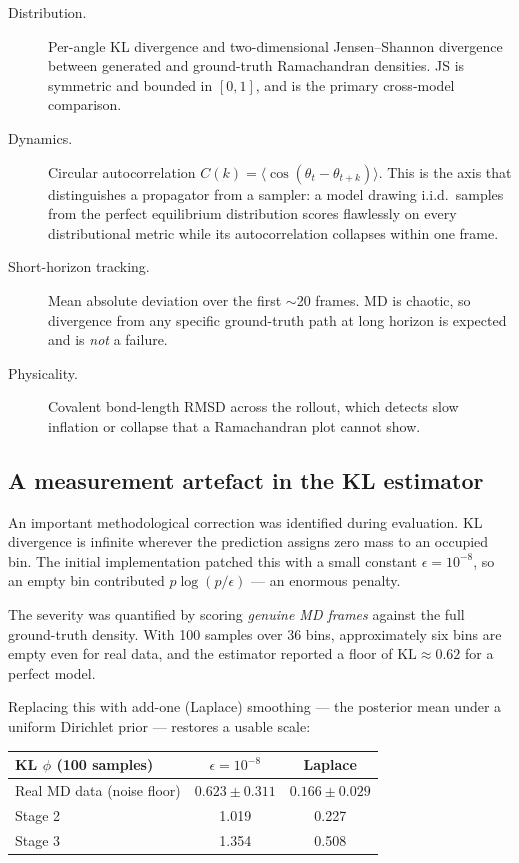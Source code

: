 \documentclass[11pt,a4paper]{article}
\begin{document}
\begin{description}
\item[Distribution.] Per-angle KL divergence and two-dimensional
Jensen--Shannon divergence between generated and ground-truth Ramachandran
densities. JS is symmetric and bounded in $[0,1]$, and is the primary
cross-model comparison.

\item[Dynamics.] Circular autocorrelation
$C(k)=\langle\cos(\theta_t-\theta_{t+k})\rangle$. This is the axis that
distinguishes a propagator from a sampler: a model drawing i.i.d.\ samples from
the perfect equilibrium distribution scores flawlessly on every distributional
metric while its autocorrelation collapses within one frame.

\item[Short-horizon tracking.] Mean absolute deviation over the first
$\sim$20 frames. MD is chaotic, so divergence from any specific ground-truth
path at long horizon is expected and is \emph{not} a failure.

\item[Physicality.] Covalent bond-length RMSD across the rollout, which detects
slow inflation or collapse that a Ramachandran plot cannot show.
\end{description}

\subsection{A measurement artefact in the KL estimator}
\label{sec:klfix}

An important methodological correction was identified during evaluation. KL
divergence is infinite wherever the prediction assigns zero mass to an occupied
bin. The initial implementation patched this with a small constant
$\epsilon = 10^{-8}$, so an empty bin contributed $p\log(p/\epsilon)$ --- an
enormous penalty.

The severity was quantified by scoring \emph{genuine MD frames} against the
full ground-truth density. With 100 samples over 36 bins, approximately six
bins are empty even for real data, and the estimator reported a floor of
$\mathrm{KL} \approx 0.62$ for a perfect model.

Replacing this with add-one (Laplace) smoothing --- the posterior mean under a
uniform Dirichlet prior --- restores a usable scale:

\begin{center}
\begin{tabular}{@{}lcc@{}}
\toprule
KL $\phi$ (100 samples) & $\epsilon = 10^{-8}$ & Laplace \\
\midrule
Real MD data (noise floor) & $0.623 \pm 0.311$ & $\mathbf{0.166 \pm 0.029}$ \\
Stage 2 & 1.019 & 0.227 \\
Stage 3 & 1.354 & 0.508 \\
\bottomrule
\end{tabular}
\end{center}
\end{document}
